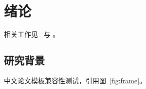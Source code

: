 \chapter{绪论}\label{ch:intro}

相关工作见~\autocite{smith2025} 与 \textcite{doe2024}。

\section{研究背景}\label{sec:background}

中文论文模板兼容性测试，引用图~\ref{fig:frame}。
